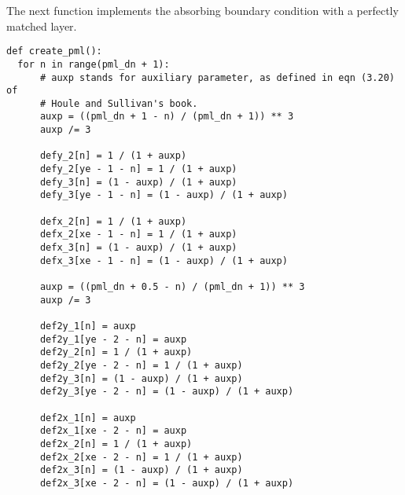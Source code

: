 \documentclass[11pt]{article}
\numberwithin{equation}{section}
\begin{document}
The next function implements the absorbing boundary condition with a perfectly
matched layer.
\begin{verbatim}
def create_pml():
  for n in range(pml_dn + 1):    
      # auxp stands for auxiliary parameter, as defined in eqn (3.20) of 
      # Houle and Sullivan's book.
      auxp = ((pml_dn + 1 - n) / (pml_dn + 1)) ** 3
      auxp /= 3
      
      defy_2[n] = 1 / (1 + auxp)
      defy_2[ye - 1 - n] = 1 / (1 + auxp)
      defy_3[n] = (1 - auxp) / (1 + auxp)
      defy_3[ye - 1 - n] = (1 - auxp) / (1 + auxp)
      
      defx_2[n] = 1 / (1 + auxp)
      defx_2[xe - 1 - n] = 1 / (1 + auxp)
      defx_3[n] = (1 - auxp) / (1 + auxp)
      defx_3[xe - 1 - n] = (1 - auxp) / (1 + auxp)
      
      auxp = ((pml_dn + 0.5 - n) / (pml_dn + 1)) ** 3
      auxp /= 3
      
      def2y_1[n] = auxp
      def2y_1[ye - 2 - n] = auxp
      def2y_2[n] = 1 / (1 + auxp)
      def2y_2[ye - 2 - n] = 1 / (1 + auxp)
      def2y_3[n] = (1 - auxp) / (1 + auxp)
      def2y_3[ye - 2 - n] = (1 - auxp) / (1 + auxp)
      
      def2x_1[n] = auxp
      def2x_1[xe - 2 - n] = auxp
      def2x_2[n] = 1 / (1 + auxp)
      def2x_2[xe - 2 - n] = 1 / (1 + auxp)
      def2x_3[n] = (1 - auxp) / (1 + auxp)
      def2x_3[xe - 2 - n] = (1 - auxp) / (1 + auxp)
\end{verbatim}
\end{document}
